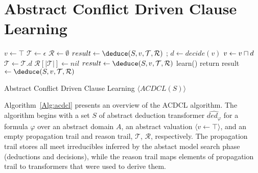 \section{Abstract Conflict Driven Clause Learning}
%
\begin{algorithm2e}[t]
\DontPrintSemicolon
{}
\begin{small}
$v \leftarrow \top$ \;
$\mathcal{T} \leftarrow \epsilon$ \;
$\mathcal{R} \leftarrow \emptyset$ \;
$result \leftarrow \deduce(S,v,\mathcal{T},\mathcal{R})$ \;
 {
  \return \safe \;
}
{
   {
    \return \unsafe;
  }
  $d \leftarrow decide(v)$ \;
  $v \leftarrow v \sqcap d$ \; 
  $\mathcal{T} \leftarrow \mathcal{T} . d$ \; 
  $\mathcal{R}[|\mathcal{T}|] \leftarrow nil$ \;
  $result \leftarrow \deduce(S,v,\mathcal{T},\mathcal{R})$\;
   {
    learn() \;
     {
      return \safe \;  
    }
    result $\leftarrow \deduce(S,v,\mathcal{T},\mathcal{R})$ \;
  }
}
\end{small}
\caption{Abstract Conflict Driven Clause Learning $\langle ACDCL(S) \rangle$ \label{Alg:acdcl}}
\end{algorithm2e}
%
Algorithm~\ref{Alg:acdcl} presents an overview of the ACDCL algorithm.
The algorithm begins with a set $S$ of abstract deduction transformer 
$\widehat{ded_{\varphi}}$ for a formula $\varphi$ over an abstract 
domain $A$, an abstract valuation $\langle v \leftarrow \top \rangle$, 
and an empty propagation trail and reason trail, $\mathcal{T}$, $\mathcal{R}$, 
respectively.  The propagation trail stores all meet irreducibles inferred 
by the abstact model search phase (deductions and decisions), while the 
reason trail maps elements of propagation trail to transformers that were 
used to derive them.  

